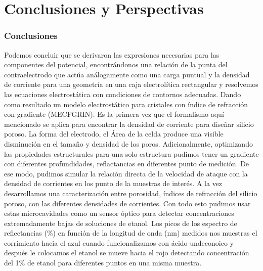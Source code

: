 \documentclass[a4paper,11pt,]{book}
\begin{document}
%
\thispagestyle{empty}
%
\chapter{Conclusiones y Perspectivas}
\thispagestyle{empty}
\subsection{Conclusiones}
Podemos concluir que se derivaron las expresiones necesarias para las componentes del potencial, encontrándonos una relación de la punta del contraelectrodo que actúa análogamente como una carga puntual y la densidad de corriente para una geometría en una caja electrolítica rectangular y resolvemos las ecuaciones electrostática con condiciones de contornos adecuadas. Dando como resultado un modelo electrostático para cristales con índice de refracción con gradiente (MECFGRIN).
Es la primera vez que el formalismo aquí mencionado se aplica para encontrar la densidad de corriente para diseñar silicio poroso. La forma del electrodo, el Área de la celda  produce una visible disminución en el tamaño y densidad de los poros. Adicionalmente,  optimizando las propiedades estructurales para una solo estructura pudimos tener un gradiente con diferentes profundidades, reflactancias en diferentes  punto de medición. De ese modo, pudimos simular la relación directa de la velocidad de ataque con la densidad de corrientes en los punto de la muestras de interés. A la vez desarrollamos una caracterización entre porosidad, índices de refracción del silicio poroso, con las diferentes densidades de corrientes. Con todo esto pudimos  usar estas microcavidades  como un sensor óptico para detectar concentraciones extremadamente bajas de soluciones de etanol. Los picos de los espectro de reflectancias ($\%$) en función de la longitud de onda (nm) medidos nos muestras el corrimiento hacia el azul cuando funcionalizamos con ácido undeconoico y después le colocamos el etanol se mueve hacia el rojo detectando concentración del 1$\%$ de etanol para diferentes puntos en una misma muestra. 
\end{document}
